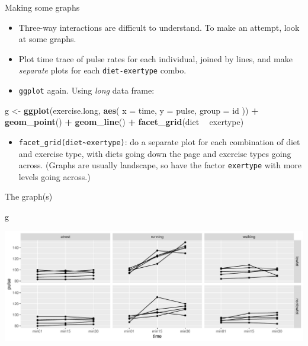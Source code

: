 \documentclass[
  ignorenonframetext,
]{beamer}
\newenvironment{Shaded}{\begin{snugshade}}{\end{snugshade}}
\newcommand{\DataTypeTok}[1]{\textcolor[rgb]{0.13,0.29,0.53}{#1}}
\newcommand{\KeywordTok}[1]{\textcolor[rgb]{0.13,0.29,0.53}{\textbf{#1}}}
\newcommand{\NormalTok}[1]{#1}
\newcommand{\OperatorTok}[1]{\textcolor[rgb]{0.81,0.36,0.00}{\textbf{#1}}}
\newcommand{\StringTok}[1]{\textcolor[rgb]{0.31,0.60,0.02}{#1}}
\providecommand{\tightlist}{%
  \setlength{\itemsep}{0pt}\setlength{\parskip}{0pt}}
\begin{document}
\begin{frame}[fragile]{Making some graphs}
\protect\hypertarget{making-some-graphs}{}

\begin{itemize}
\item
  Three-way interactions are difficult to understand. To make an
  attempt, look at some graphs.
\item
  Plot time trace of pulse rates for each individual, joined by lines,
  and make \emph{separate} plots for each \texttt{diet-exertype} combo.
\item
  \texttt{ggplot} again. Using \emph{long} data frame:
\end{itemize}

\begin{Shaded}
\begin{Highlighting}[]
\NormalTok{g <-}\StringTok{ }\KeywordTok{ggplot}\NormalTok{(exercise.long, }\KeywordTok{aes}\NormalTok{(}
  \DataTypeTok{x =}\NormalTok{ time, }\DataTypeTok{y =}\NormalTok{ pulse,}
  \DataTypeTok{group =}\NormalTok{ id}
\NormalTok{)) }\OperatorTok{+}\StringTok{ }\KeywordTok{geom_point}\NormalTok{() }\OperatorTok{+}\StringTok{ }\KeywordTok{geom_line}\NormalTok{() }\OperatorTok{+}
\StringTok{  }\KeywordTok{facet_grid}\NormalTok{(diet }\OperatorTok{~}\StringTok{ }\NormalTok{exertype)}
\end{Highlighting}
\end{Shaded}

\begin{itemize}
\tightlist
\item
  \texttt{facet\_grid(diet\textasciitilde{}exertype)}: do a separate
  plot for each combination of diet and exercise type, with diets going
  down the page and exercise types going across. (Graphs are usually
  landscape, so have the factor \texttt{exertype} with more levels going
  across.)
\end{itemize}

\end{frame}

\begin{frame}[fragile]{The graph(s)}
\protect\hypertarget{the-graphs}{}

\begin{Shaded}
\begin{Highlighting}[]
\NormalTok{g}
\end{Highlighting}
\end{Shaded}

\includegraphics{slides_d29_files/figure-beamer/unnamed-chunk-291-1.pdf}

\end{frame}
\end{document}
